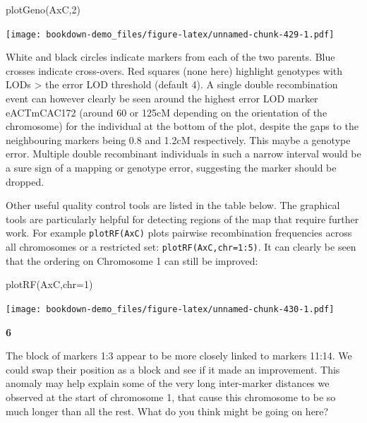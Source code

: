 \documentclass[
]{book}
\makeatletter
\newenvironment{Shaded}{\begin{snugshade}}{\end{snugshade}}
\newcommand{\AttributeTok}[1]{\textcolor[rgb]{0.77,0.63,0.00}{#1}}
\newcommand{\DecValTok}[1]{\textcolor[rgb]{0.00,0.00,0.81}{#1}}
\newcommand{\FunctionTok}[1]{\textcolor[rgb]{0.00,0.00,0.00}{#1}}
\newcommand{\NormalTok}[1]{#1}
\newenvironment{kframe}{%
\medskip{}
\setlength{\fboxsep}{.8em}
 \def\at@end@of@kframe{}%
 \ifinner\ifhmode%
  \def\at@end@of@kframe{\end{minipage}}%
  \begin{minipage}{\columnwidth}%
 \fi\fi%
 \def\FrameCommand##1{\hskip\@totalleftmargin \hskip-\fboxsep
 \colorbox{shadecolor}{##1}\hskip-\fboxsep
     \hskip-\linewidth \hskip-\@totalleftmargin \hskip\columnwidth}%
 \MakeFramed {\advance\hsize-\width
   \@totalleftmargin\z@ \linewidth\hsize
   \@setminipage}}%
 {\par\unskip\endMakeFramed%
 \at@end@of@kframe}
\newenvironment{rmdblock}[1]
  {
  \begin{itemize}
  \renewcommand{\labelitemi}{
    \raisebox{-.7\height}[0pt][0pt]{
      {\setkeys{Gin}{width=3em,keepaspectratio}\texttt{[image: images/\#1]}}
    }
  }
  \setlength{\fboxsep}{1em}
  \begin{kframe}
  \item
  }
  {
  \end{kframe}
  \end{itemize}
  }
\newenvironment{rmdquiz}
  {\begin{rmdblock}{quiz}}
  {\end{rmdblock}}
\makeatother
\begin{document}
\begin{Shaded}
\begin{Highlighting}[]
\FunctionTok{plotGeno}\NormalTok{(AxC,}\DecValTok{2}\NormalTok{)}
\end{Highlighting}
\end{Shaded}

\texttt{[image: bookdown-demo\_files/figure-latex/unnamed-chunk-429-1.pdf]}

White and black circles indicate markers from each of the two parents. Blue crosses indicate cross-overs. Red squares (none here) highlight genotypes with LODs \textgreater{} the error LOD threshold (default 4). A single double recombination event can however clearly be seen around the highest error LOD marker eACTmCAC172 (around 60 or 125cM depending on the orientation of the chromosome) for the individual at the bottom of the plot, despite the gaps to the neighbouring markers being 0.8 and 1.2cM respectively. This maybe a genotype error. Multiple double recombinant individuals in such a narrow interval would be a sure sign of a mapping or genotype error, suggesting the marker should be dropped.

Other useful quality control tools are listed in the table below. The graphical tools are particularly helpful for detecting regions of the map that require further work. For example \texttt{plotRF(AxC)} plots pairwise recombination frequencies across all chromosomes or a restricted set: \texttt{plotRF(AxC,chr=1:5)}. It can clearly be seen that the ordering on Chromosome 1 can still be improved:

\begin{Shaded}
\begin{Highlighting}[]
\FunctionTok{plotRF}\NormalTok{(AxC,}\AttributeTok{chr=}\DecValTok{1}\NormalTok{)}
\end{Highlighting}
\end{Shaded}

\texttt{[image: bookdown-demo\_files/figure-latex/unnamed-chunk-430-1.pdf]}

\begin{rmdquiz}
\textbf{6}

The block of markers 1:3 appear to be more closely linked to markers 11:14. We could swap their position as a block and see if it made an improvement. This anomaly may help explain some of the very long inter-marker distances we observed at the start of chromosome 1, that cause this chromosome to be so much longer than all the rest. What do you think might be going on here?
\end{rmdquiz}
\end{document}
